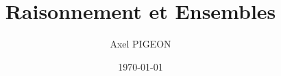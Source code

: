 \documentclass{report}
\title{Raisonnement et Ensembles}
\author{Axel PIGEON}
\date{\today}
\theoremstyle{plain}
\begin{document}


\maketitle

\tableofcontents
\newpage

\end{document}
